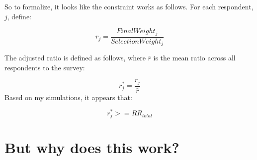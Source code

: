 \documentclass[
]{article}
\begin{document}
So to formalize, it looks like the constraint works as follows. For each
respondent, \(j\), define:

\[
r_j = \frac{FinalWeight_j}{SelectionWeight_j}
\]

The adjusted ratio is defined as follows, where \(\bar{r}\) is the mean
ratio across all respondents to the survey:

\[
r^{*}_j = \frac{r_j}{\bar{r}}
\] Based on my simulations, it appears that:

\[
r^{*}_{j}>= RR_{total}
\]

\hypertarget{but-why-does-this-work}{%
\section{But why does this work?}\label{but-why-does-this-work}}

🤷
\end{document}
